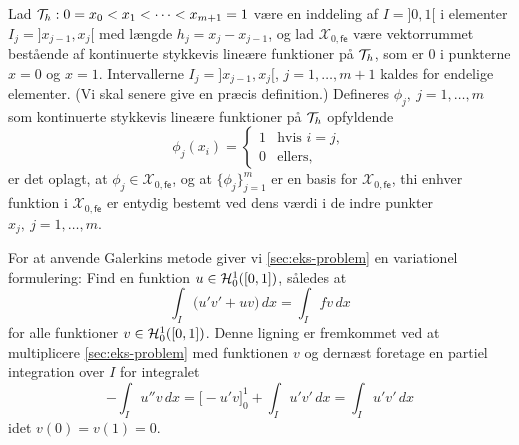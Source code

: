 Lad $\mathcal T_h: 0=x_0 < x_1 < \dots < x_{m+1}=1$ være en inddeling af
$I=]0,1[$ i elementer $I_j=]x_{j-1},x_j[$ med længde
$h_j=x_j-x_{j-1}$, og lad ${\mathcal X}_{0,{\mathsf{fe}}}$ være 
vektorrummet bestående af kontinuerte stykkevis lineære funktioner 
på $\mathcal T_h$, som er 0 i punkterne $x=0$ og $x=1$. Intervallerne
$I_j=]x_{j-1},x_j[$, $j=1,\ldots,m+1$ kaldes for endelige elementer.
(Vi skal senere give en præcis definition.) Defineres 
$\phi_j, \ j=1,\ldots,m$ som kontinuerte stykkevis lineære funktioner
på $\mathcal T_h$ opfyldende
\begin{equation}
  \phi_j(x_i)=
    \begin{cases}
      1 & \text{hvis $i=j$}, \\
      0 & \text{ellers},
    \end{cases}
\end{equation}
er det oplagt, at $\phi_j \in {\mathcal X}_{0,{\mathsf{fe}}}$, og at 
$\{\phi_j\}_{j=1}^m$ er en basis for ${\mathcal X}_{0,{\mathsf{fe}}}$,
thi enhver funktion i ${\mathcal X}_{0,{\mathsf{fe}}}$ er entydig
bestemt ved dens værdi i de indre punkter $x_j, \ j=1,\ldots,m$.

For at anvende Galerkins metode giver vi \eqref{sec:eks-problem}
en variationel formulering: Find en funktion $u\in\mathcal H^1_0([0,1])$,
således at
\begin{equation} \label{sec:eks-variationel}
  \int_I \bigl( u'v' +uv \bigr)\, dx = \int_I fv\, dx 
\end{equation} 
for alle funktioner $v\in\mathcal H^1_0([0,1])$. Denne ligning er fremkommet
ved at multiplicere \eqref{sec:eks-problem} med funktionen $v$ og
dernæst foretage en partiel integration over $I$ for integralet
\begin{equation}
  - \int_I u''v\, dx = \bigl[-u'v\bigr]_0^1 + \int_I u'v'\, dx = 
    \int_I u'v'\, dx
\end{equation}
idet $v(0)=v(1)=0$.

